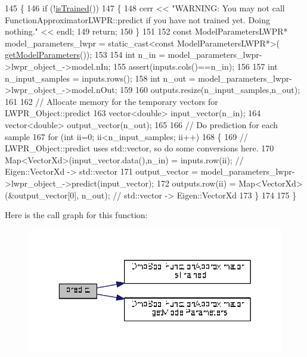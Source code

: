 \begin{DoxyCode}
145 \{
146   \textcolor{keywordflow}{if} (!\hyperlink{classDmpBbo_1_1FunctionApproximator_a178135f623d9b9058870851a53299c6e}{isTrained}())  
147   \{
148     cerr << \textcolor{stringliteral}{"WARNING: You may not call FunctionApproximatorLWPR::predict if you have not trained yet. Doing
       nothing."} << endl;
149     \textcolor{keywordflow}{return};
150   \}
151 
152   \textcolor{keyword}{const} ModelParametersLWPR* model\_parameters\_lwpr = \textcolor{keyword}{static\_cast<}\textcolor{keyword}{const }ModelParametersLWPR*\textcolor{keyword}{>}(
      \hyperlink{classDmpBbo_1_1FunctionApproximator_a0e7e116ed9b159d782fca544dacb4bac}{getModelParameters}());
153 
154   \textcolor{keywordtype}{int} n\_in  = model\_parameters\_lwpr->lwpr\_object\_->model.nIn;
155   assert(inputs.cols()==n\_in);
156   
157   \textcolor{keywordtype}{int} n\_input\_samples = inputs.rows();
158   \textcolor{keywordtype}{int} n\_out = model\_parameters\_lwpr->lwpr\_object\_->model.nOut;
159 
160   outputs.resize(n\_input\_samples,n\_out);
161   
162   \textcolor{comment}{// Allocate memory for the temporary vectors for LWPR\_Object::predict}
163   vector<double> input\_vector(n\_in);
164   vector<double> output\_vector(n\_out);
165 
166   \textcolor{comment}{// Do prediction for each sample  }
167   \textcolor{keywordflow}{for} (\textcolor{keywordtype}{int} ii=0; ii<n\_input\_samples; ii++)
168   \{
169     \textcolor{comment}{// LWPR\_Object::predict uses std::vector, so do some conversions here.}
170     Map<VectorXd>(input\_vector.data(),n\_in) = inputs.row(ii);  \textcolor{comment}{// Eigen::VectorXd -> std::vector}
171     output\_vector = model\_parameters\_lwpr->lwpr\_object\_->predict(input\_vector);
172     outputs.row(ii) = Map<VectorXd>(&output\_vector[0], n\_out); \textcolor{comment}{// std::vector -> Eigen::VectorXd}
173   \}
174   
175 \}
\end{DoxyCode}


Here is the call graph for this function\+:
\nopagebreak
\begin{figure}[H]
\begin{center}
\leavevmode
\includegraphics[width=329pt]{classDmpBbo_1_1FunctionApproximatorLWPR_afe8dcfb9cd065dfde38dce1f6e6cd3e6_cgraph}
\end{center}
\end{figure}


